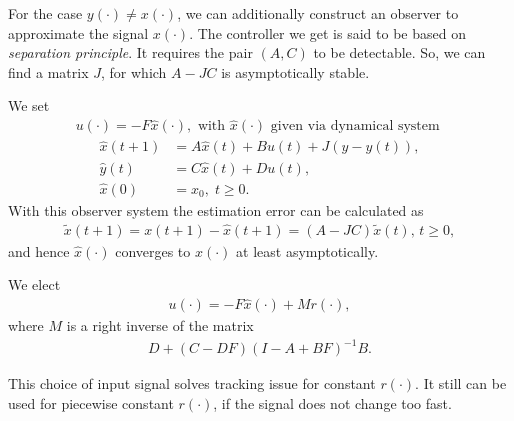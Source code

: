 For the case $y(\cdot) \neq x(\cdot)$, we can additionally construct an observer to approximate the signal $x(\cdot)$. The  controller we get is said to be based on \textit{separation principle}.
It requires the pair $(A,C)$ to be detectable. So, we can find a matrix $J$, for which $A - JC$ is asymptotically stable.

We set 
\begin{align}
u(\cdot)= -F \hat{x}(\cdot), \text{ with } \hat{x}(\cdot) \text{ given via dynamical system }
\end{align}
\begin{align}
\hat{x}(t+1) &= A\hat{x}(t) + B u(t) + J (y - \hat{y}(t)), \\
\hat{y}(t) & = C\hat{x}(t) + D u(t), \\
\hat{x}(0)& = x_0, \; t \geq 0. 
\end{align}
With this observer system the estimation error can be calculated as \begin{align}
\tilde{x}(t+1) = x(t+1) - \hat{x}(t+1) = (A - JC) \tilde{x}(t), \, t \geq 0,
\end{align} and hence $\hat{x} (\cdot)$ converges to $x(\cdot)$ at least asymptotically. 

We elect
\begin{align}
u(\cdot) = -F\hat{x}(\cdot) + Mr(\cdot), 
\end{align}
where $M$ is a right inverse of the matrix 
\begin{align}
D + (C - D F) (I - A + B F)^{-1} B.
\end{align}

This choice of input signal 
solves tracking issue for constant $r(\cdot)$. It still can be used for piecewise constant $r(\cdot)$, if the signal does not change too fast.















 
 
 









